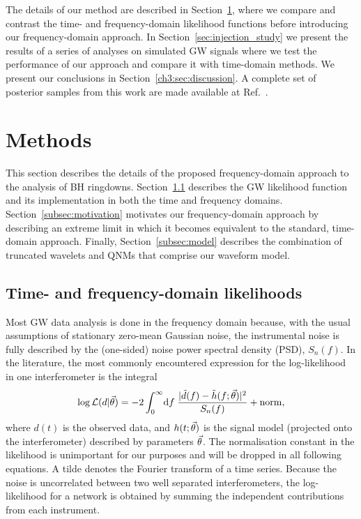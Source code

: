 The details of our method are described in Section~\ref{sec:methods}, where we compare and contrast the time- and frequency-domain likelihood functions before introducing our frequency-domain approach.
In Section~\ref{sec:injection_study} we present the results of a series of analyses on simulated GW signals where we test the performance of our approach and compare it with time-domain methods.
We present our conclusions in Section~\ref{ch3:sec:discussion}.
A complete set of posterior samples from this work are made available at Ref.~\cite{finch_eliot_2021_5569759}.


\section{Methods}\label{sec:methods}

This section describes the details of the proposed frequency-domain approach to the analysis of BH ringdowns. 
Section~\ref{subsec:data_analysis} describes the GW likelihood function and its implementation in both the time and frequency domains.
Section~\ref{subsec:motivation} motivates our frequency-domain approach by describing an extreme limit in which it becomes equivalent to the standard, time-domain approach.
Finally, Section~\ref{subsec:model} describes the combination of truncated wavelets and QNMs that comprise our waveform model.


\subsection{Time- and frequency-domain likelihoods}\label{subsec:data_analysis}

Most GW data analysis is done in the frequency domain because, with the usual assumptions of stationary zero-mean Gaussian noise, the instrumental noise is fully described by the (one-sided) noise power spectral density (PSD), $S_n(f)$.
In the literature, the most commonly encountered expression for the log-likelihood in one interferometer is the integral
\begin{align} \label{eq:logL_FD_continuous}
	\log\mathcal{L}(d|\vec{\theta}) = -2\int_{0}^{\infty}\!\mathrm{d}f\;\frac{|\tilde{d}(f)-\tilde{h}(f;\vec{\theta})|^2}{S_n(f)} + \mathrm{norm},
\end{align}
where $d(t)$ is the observed data, and $h(t;\vec{\theta})$ is the signal model (projected onto the interferometer) described by parameters $\vec{\theta}$.
The normalisation constant in the likelihood is unimportant for our purposes and will be dropped in all following equations.
A tilde denotes the Fourier transform of a time series.
Because the noise is uncorrelated between two well separated interferometers, the log-likelihood for a network is obtained by summing the independent contributions from each instrument.

